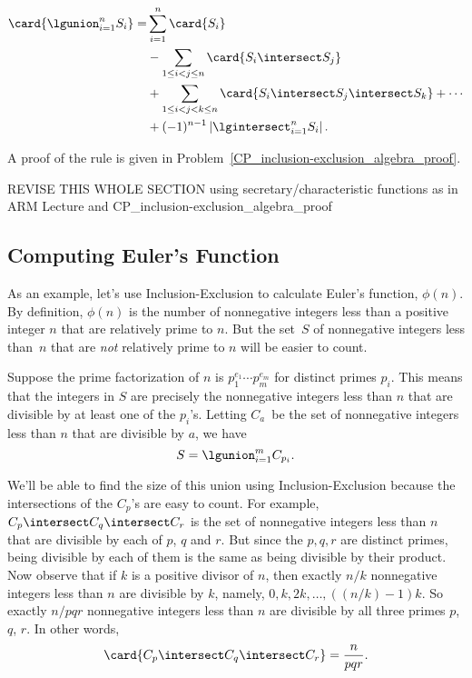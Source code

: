 \begin{rul*}
\begin{align*}
\card{\lgunion_{i=1}^n S_i}
   = & \sum_{i=1}^n \card{S_i}\\
     & - \sum_{1\leq i < j \leq n} \card{S_i \intersect S_j}\\
     &  + \sum_{1\leq i < j < k \leq n} \card{S_i \intersect S_j
       \intersect S_k} + \cdots\\
     & + (-1)^{n-1} \left| \lgintersect_{i=1}^n S_i \right|.
\end{align*}
\end{rul*}

A proof of the rule is given in
Problem~\ref{CP_inclusion-exclusion_algebra_proof}.

\begin{editingnotes}
REVISE THIS WHOLE SECTION using secretary/characteristic functions as in ARM
Lecture and CP_inclusion-exclusion_algebra_proof
\end{editingnotes}

\subsection{Computing Euler's Function}

As an example, let's use Inclusion-Exclusion to calculate Euler's
function, $\phi(n)$.  By definition, $\phi(n)$ is the number of
nonnegative integers less than a positive integer $n$ that are
relatively prime to $n$.  But the set~$S$ of nonnegative integers less
than~$n$ that are \emph{not} relatively prime to $n$ will be easier to
count.

Suppose the prime factorization of $n$ is $p_1^{e_1}\cdots p_m^{e_m}$
for distinct primes $p_i$.  This means that the integers in $S$ are
precisely the nonnegative integers less than $n$ that are divisible by at
least one of the $p_i$'s.  Letting $C_a$~be the set of nonnegative
integers less than $n$ that are divisible by $a$, we have
\[
S = \lgunion_{i=1}^m C_{p_i}.
\]

We'll be able to find the size of this union using Inclusion-Exclusion
because the intersections of the $C_p$'s are easy to count.  For example,
$C_p \intersect C_q \intersect C_r$ is the set of nonnegative integers less
than $n$ that are divisible by each of $p$, $q$ and $r$.  But since
the $p,q,r$ are distinct primes, being divisible by each of them is
the same as being divisible by their product.  Now observe that if $k$ is
a positive divisor of $n$, then exactly $n/k$ nonnegative integers less
than $n$ are divisible by $k$, namely, $0,k,2k,\dots,((n/k)-1)k$.  So
exactly $n/pqr$ nonnegative integers less than $n$ are divisible by
all three primes $p$, $q$, $r$.  In other words,
\[
\card{C_p \intersect C_q \intersect C_r} = \frac{n}{pqr}.
\]


